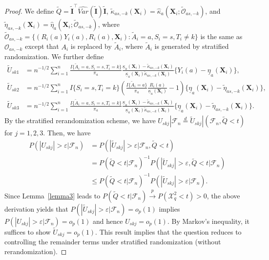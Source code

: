 \documentclass[12pt]{article}
\newcommand{\bX}{\boldsymbol{X}}
\newcommand{\bI}{\boldsymbol{I}}
\newcommand{\tA}{\widetilde{A}}
\begin{document}
\begin{proof}
 We define $\widetilde{Q}=\widetilde{\bI}^\top \widehat{Var}(\widetilde{\bI}) \widetilde{\bI}$, $\widetilde{\kappa}_{as,-k}(\bX_i) = \widehat{\kappa}_{a}(\bX_i; \widetilde{\mathcal{O}}_{as,-k})$, and $\widetilde{\eta}_{as,-k}(\bX_i) = \widehat{\eta}_a(\bX_i; \widetilde{\mathcal{O}}_{as,-k})$, where $\widetilde{\mathcal{O}}_{as, -k}=\{(R_i(a)Y_i(a), R_i(a), \bX_i): \tA_i = a, S_i=s, T_i\ne k\}$ is the same as $\mathcal{O}_{as, -k}$ except that $A_i$ is replaced by $\tA_i$, where $\tA_i$ is generated by stratified randomization. We further define
     \begin{align*}
    \widetilde{U}_{sk1} &= n^{-1/2} \sum_{i=1}^n \frac{I\{\tA_i=a,S_i=s, T_i=k\}}{\pi_a} \frac{\underline{\kappa}_{a}(\bX_i) - \widetilde{\kappa}_{as,-k}(\bX_i)}{\underline{\kappa}_{a}(\bX_i)\widetilde{\kappa}_{as,-k}(\bX_i)}\{Y_i(a) - \underline{\eta}_{a}(\bX_i)\},\\
    \widetilde{U}_{sk2} &= n^{-1/2} \sum_{i=1}^n I\{S_i=s, T_i=k\}\left(\frac{I\{\tA_i=a\}}{\pi_a} \frac{R_i(a)}{\underline{\kappa}_{a}(\bX_i)}-1\right)  \{\underline{\eta}_{a}(\bX_i)-\widetilde{\eta}_{as,-k}(\bX_i)\},\\
    \widetilde{U}_{sk3} &= n^{-1/2} \sum_{i=1}^n \frac{I\{\tA_i=a,S_i=s, T_i=k\}}{\pi_a} \frac{\underline{\kappa}_a(\bX_i) - \widetilde{\kappa} _{as,-k}(\bX_i)}{\underline{\kappa}_a(\bX_i)\widetilde{\kappa} _{as,-k}(\bX_i)}\{\underline{\eta}_{a}(\bX_i)-\widetilde{\eta}_{as,-k}(\bX_i)\}.
\end{align*}
By the stratified rerandomization scheme, we have $U_{skj}|\mathcal{F}_n \overset{d}{=} \widetilde{U}_{skj}|( \mathcal{F}_n, \widetilde{Q} < t)$ for $j=1,2,3$. 
Then, we have
\begin{align*}
   P(|U_{skj}|> \varepsilon|\mathcal{F}_n) &= P(|\widetilde{U}_{skj}|> \varepsilon|\mathcal{F}_n, \widetilde{Q}<t)\\
   &= P(\widetilde{Q}<t|\mathcal{F}_n)^{-1} P(|\widetilde{U}_{skj}|> \varepsilon, \widetilde{Q}<t|\mathcal{F}_n) \\
   &\le  P(\widetilde{Q}<t|\mathcal{F}_n)^{-1} P(|\widetilde{U}_{skj}|> \varepsilon|\mathcal{F}_n).
\end{align*}
Since Lemma~\ref{lemma3} leads to $P(\widetilde{Q}<t|\mathcal{F}_n) \xrightarrow{p} P(\mathcal{X}^2_q < t) > 0$, the above derivation yields that $P(|\widetilde{U}_{skj}|> \varepsilon|\mathcal{F}_n) = o_p(1)$ implies $ P(|U_{skj}|> \varepsilon|\mathcal{F}_n) =o_p(1)$ and hence $U_{skj} = o_p(1)$. By Markov's inequality, it suffices to show $\widetilde{U}_{skj}= o_p(1)$. 
This result implies that the question reduces to controlling the remainder terms under stratified randomization (without rerandomization).


\end{proof}
\end{document}
